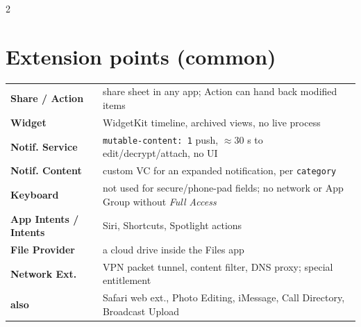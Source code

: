 \documentclass[8pt]{extarticle}
\begin{document}
\begin{multicols}{2}
\raggedright

\section{Extension points (common)}
{\footnotesize
\begin{tabular}{@{}>{\raggedright\arraybackslash}p{19mm}>{\raggedright\arraybackslash}p{56mm}@{}}
\toprule
\textbf{Share / Action} & share sheet in any app; Action can hand back modified items \\
\textbf{Widget} & WidgetKit timeline, archived views, no live process \\
\textbf{Notif. Service} & \texttt{mutable-content: 1} push, $\approx$30 s to edit/decrypt/attach, no UI \\
\textbf{Notif. Content} & custom VC for an expanded notification, per \texttt{category} \\
\textbf{Keyboard} & not used for secure/phone-pad fields; no network or App Group without \emph{Full Access} \\
\textbf{App Intents / Intents} & Siri, Shortcuts, Spotlight actions \\
\textbf{File Provider} & a cloud drive inside the Files app \\
\textbf{Network Ext.} & VPN packet tunnel, content filter, DNS proxy; special entitlement \\
\textbf{also} & Safari web ext., Photo Editing, iMessage, Call Directory, Broadcast Upload \\
\bottomrule
\end{tabular}}


\end{multicols}
\end{document}
